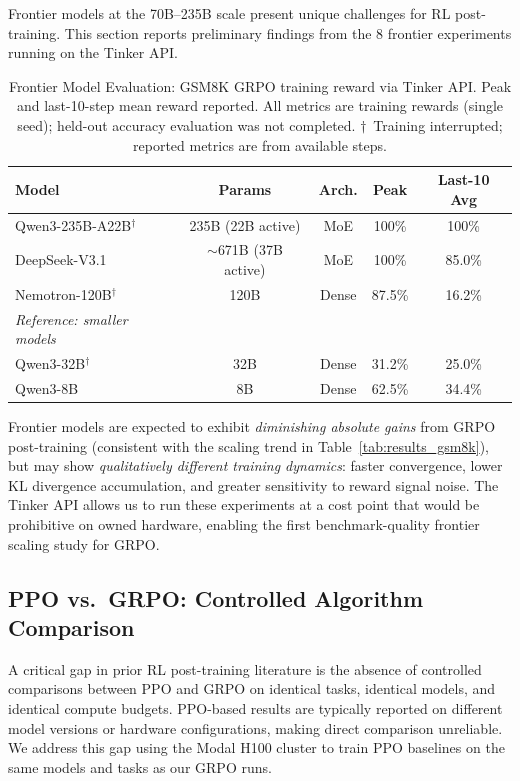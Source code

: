 \documentclass{article}
\begin{document}
Frontier models at the 70B--235B scale present unique challenges for RL
post-training. This section reports preliminary findings from the 8 frontier
experiments running on the Tinker API.

\begin{table}[htbp]
\centering
\caption{Frontier Model Evaluation: GSM8K GRPO training reward via Tinker API.
Peak and last-10-step mean reward reported. All metrics are training rewards
(single seed); held-out accuracy evaluation was not completed.
$\dagger$~Training interrupted; reported metrics are from available steps.}
\label{tab:frontier}
\begin{tabular}{lcccc}
\toprule
\textbf{Model} & \textbf{Params} & \textbf{Arch.} & \textbf{Peak} & \textbf{Last-10 Avg} \\
\midrule
Qwen3-235B-A22B$^\dagger$ & 235B (22B active) & MoE & 100\% & 100\% \\
DeepSeek-V3.1 & $\sim$671B (37B active) & MoE & 100\% & 85.0\% \\
Nemotron-120B$^\dagger$ & 120B & Dense & 87.5\% & 16.2\% \\
\midrule
\textit{Reference: smaller models} & & & & \\
Qwen3-32B$^\dagger$ & 32B & Dense & 31.2\% & 25.0\% \\
Qwen3-8B & 8B & Dense & 62.5\% & 34.4\% \\
\bottomrule
\end{tabular}
\end{table}

Frontier models are expected to exhibit \emph{diminishing absolute gains}
from GRPO post-training (consistent with the scaling trend in
Table~\ref{tab:results_gsm8k}), but may show \emph{qualitatively different
training dynamics}: faster convergence, lower KL divergence accumulation,
and greater sensitivity to reward signal noise. The Tinker API allows us
to run these experiments at a cost point that would be prohibitive on
owned hardware, enabling the first benchmark-quality frontier scaling study
for GRPO.

\subsection{PPO vs.~GRPO: Controlled Algorithm Comparison}
\label{sec:ppo_grpo}

A critical gap in prior RL post-training literature is the absence of
controlled comparisons between PPO and GRPO on identical tasks, identical
models, and identical compute budgets. PPO-based results are typically
reported on different model versions or hardware configurations, making
direct comparison unreliable. We address this gap using the Modal H100
cluster to train PPO baselines on the same models and tasks as our GRPO runs.
\end{document}
